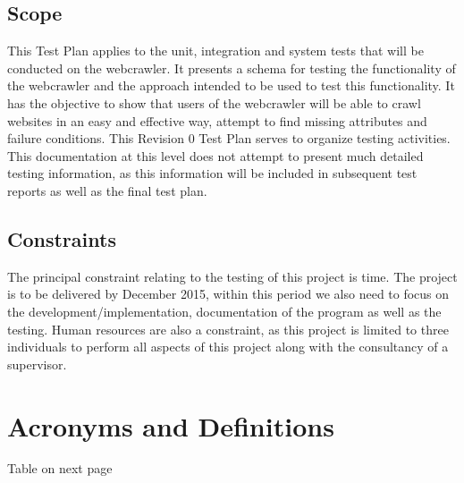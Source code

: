 \documentclass[12pt]{article}
\begin{document}
\subsection{Scope}
This Test Plan applies to the unit,  integration and system tests that will be conducted on the webcrawler. It presents a schema for testing the functionality of the webcrawler and the approach intended to be used to test this functionality. It has the objective to show that users of the webcrawler will be able to crawl websites in an easy and effective way, attempt to find missing attributes and failure conditions. This Revision 0 Test Plan serves to organize testing activities. This documentation at this level does not attempt to present much detailed testing information, as this information will be included in subsequent test reports as well as the final test plan.


\subsection{Constraints}
The principal constraint relating to the testing of this project is time. The project is to be delivered by December 2015, within this period we also need to focus on the development/implementation, documentation of the program as well as the testing. Human resources are also a  constraint, as this project is limited to three individuals to perform all aspects of this project along with the consultancy of a supervisor. \newline



 \section{Acronyms and Definitions}
 Table on next page
 
\end{document}
